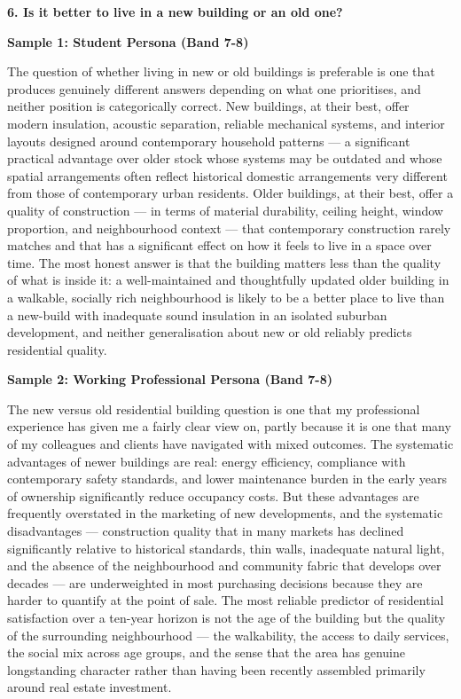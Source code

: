 \separator

\begin{ieltsquestion}
\textbf{6. Is it better to live in a new building or an old one?}
\end{ieltsquestion}
\textbf{Sample 1: Student Persona (Band 7-8)}

The question of whether living in new or old buildings is preferable is one that produces genuinely different answers depending on what one prioritises, and neither position is categorically correct. New buildings, at their best, offer modern insulation, acoustic separation, reliable mechanical systems, and interior layouts designed around contemporary household patterns — a significant practical advantage over older stock whose systems may be outdated and whose spatial arrangements often reflect historical domestic arrangements very different from those of contemporary urban residents. Older buildings, at their best, offer a quality of construction — in terms of material durability, ceiling height, window proportion, and neighbourhood context — that contemporary construction rarely matches and that has a significant effect on how it feels to live in a space over time. The most honest answer is that the building matters less than the quality of what is inside it: a well-maintained and thoughtfully updated older building in a walkable, socially rich neighbourhood is likely to be a better place to live than a new-build with inadequate sound insulation in an isolated suburban development, and neither generalisation about new or old reliably predicts residential quality.

\textbf{Sample 2: Working Professional Persona (Band 7-8)}

The new versus old residential building question is one that my professional experience has given me a fairly clear view on, partly because it is one that many of my colleagues and clients have navigated with mixed outcomes. The systematic advantages of newer buildings are real: energy efficiency, compliance with contemporary safety standards, and lower maintenance burden in the early years of ownership significantly reduce occupancy costs. But these advantages are frequently overstated in the marketing of new developments, and the systematic disadvantages — construction quality that in many markets has declined significantly relative to historical standards, thin walls, inadequate natural light, and the absence of the neighbourhood and community fabric that develops over decades — are underweighted in most purchasing decisions because they are harder to quantify at the point of sale. The most reliable predictor of residential satisfaction over a ten-year horizon is not the age of the building but the quality of the surrounding neighbourhood — the walkability, the access to daily services, the social mix across age groups, and the sense that the area has genuine longstanding character rather than having been recently assembled primarily around real estate investment.

